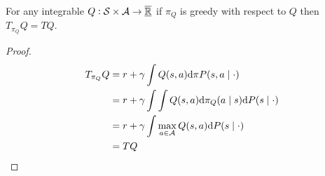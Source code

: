\begin{prop}
  For any integrable $Q : \mathcal{S} \times \mathcal{A} \to \overline{\underline{\mathbb{R}}}$
  if $\pi_Q$ is greedy with respect to $Q$ then $T_{\pi_Q} Q = TQ$.
\end{prop}
\begin{proof}
  \begin{align*}
    T_{\pi_Q} Q &= r + \gamma \int Q(s, a) \mathrm{d} \pi P(s, a \mid \cdot)
    \\ &= r + \gamma \int \int Q(s, a)
    \mathrm{d} \pi_Q(a \mid s) \mathrm{d} P(s \mid \cdot)
    \\ &= r + \gamma \int \max_{a \in \mathcal{A}} Q(s, a)
    \mathrm{d} P(s \mid \cdot)
    \\ &= T Q
  \end{align*}
\end{proof}

